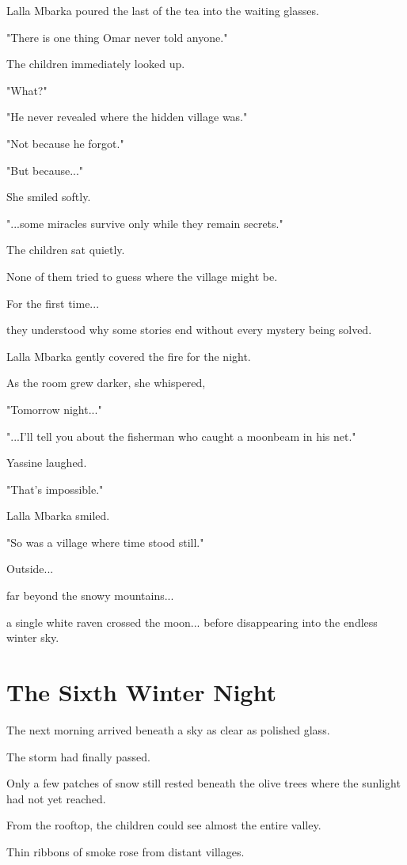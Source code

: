 \documentclass[12pt,openany]{book}
\begin{document}
Lalla Mbarka poured the last of the tea into the waiting glasses.

"There is one thing Omar never told anyone."

The children immediately looked up.

"What?"

"He never revealed where the hidden village was."

"Not because he forgot."

"But because..."

She smiled softly.

"...some miracles survive only while they remain secrets."

The children sat quietly.

None of them tried to guess where the village might be.

For the first time...

they understood why some stories end without every mystery being solved.

Lalla Mbarka gently covered the fire for the night.

As the room grew darker, she whispered,

"Tomorrow night..."

"...I'll tell you about the fisherman who caught a moonbeam in his net."

Yassine laughed.

"That's impossible."

Lalla Mbarka smiled.

"So was a village where time stood still."

Outside...

far beyond the snowy mountains...

a single white raven crossed the moon...
before disappearing into the endless winter sky.
\chapter{The Sixth Winter Night}

The next morning arrived beneath a sky as clear as polished glass.

The storm had finally passed.

Only a few patches of snow still rested beneath the olive trees where the sunlight had not yet reached.

From the rooftop, the children could see almost the entire valley.

Thin ribbons of smoke rose from distant villages.
\end{document}
